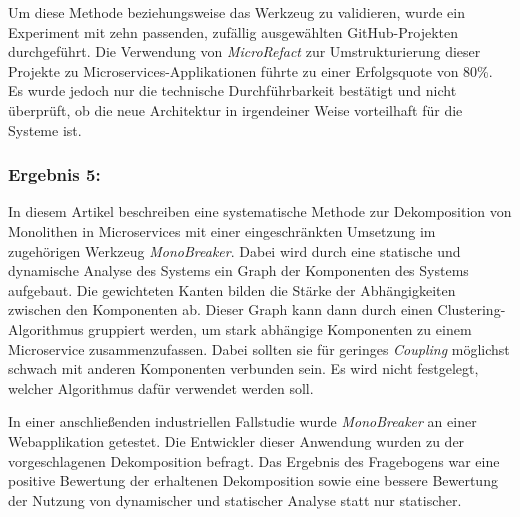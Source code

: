 Um diese Methode beziehungsweise das Werkzeug zu validieren, wurde ein Experiment mit zehn passenden, zufällig ausgewählten GitHub-Projekten durchgeführt.
Die Verwendung von \emph{MicroRefact} zur Umstrukturierung dieser Projekte zu Microservices-Applikationen führte zu einer Erfolgsquote von 80\%.
Es wurde jedoch nur die technische Durchführbarkeit bestätigt und nicht überprüft, ob die neue Architektur in irgendeiner Weise vorteilhaft für die Systeme ist.

%

\subsubsection{Ergebnis 5:  \cite{arh-result-no-filter-5}}

In diesem Artikel beschreiben \citeauthor{arh-result-no-filter-5} eine systematische Methode zur Dekomposition von Monolithen in Microservices mit einer eingeschränkten Umsetzung im zugehörigen Werkzeug \emph{MonoBreaker}.
Dabei wird durch eine statische und dynamische Analyse des Systems ein Graph der Komponenten des Systems aufgebaut.
Die gewichteten Kanten bilden die Stärke der Abhängigkeiten zwischen den Komponenten ab.
Dieser Graph kann dann durch einen Clustering-Algorithmus gruppiert werden, um stark abhängige Komponenten zu einem Microservice zusammenzufassen.
Dabei sollten sie für geringes \emph{Coupling} möglichst schwach mit anderen Komponenten verbunden sein. 
Es wird nicht festgelegt, welcher Algorithmus dafür verwendet werden soll.

In einer anschließenden industriellen Fallstudie wurde \emph{MonoBreaker} an einer Webapplikation getestet.
Die Entwickler dieser Anwendung wurden zu der vorgeschlagenen Dekomposition befragt.
Das Ergebnis des Fragebogens war eine positive Bewertung der erhaltenen Dekomposition sowie eine bessere Bewertung der Nutzung von dynamischer und statischer Analyse statt nur statischer.

